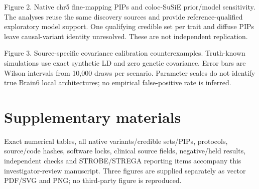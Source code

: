 \documentclass[11pt]{article}
\begin{document}
Figure 2. Native chr5 fine-mapping PIPs and coloc-SuSiE prior/model sensitivity. The analyses reuse the same discovery sources and provide reference-qualified exploratory model support. One qualifying credible set per trait and diffuse PIPs leave causal-variant identity unresolved. These are not independent replication.

Figure 3. Source-specific covariance calibration counterexamples. Truth-known simulations use exact synthetic LD and zero genetic covariance. Error bars are Wilson intervals from 10,000 draws per scenario. Parameter scales do not identify true Brain6 local architectures; no empirical false-positive rate is inferred.

\section*{Supplementary materials}
Exact numerical tables, all native variants/credible sets/PIPs, protocols, source/code hashes, software locks, clinical source fields, negative/held results, independent checks and STROBE/STREGA reporting items accompany this investigator-review manuscript. Three figures are supplied separately as vector PDF/SVG and PNG; no third-party figure is reproduced.
\end{document}
